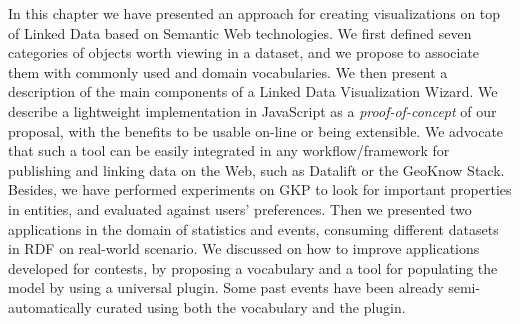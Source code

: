 In this chapter we have presented  an approach for creating visualizations on top of Linked Data based on Semantic Web technologies. We first defined seven categories of objects worth viewing in a dataset, and we propose to associate them with commonly used and domain vocabularies. We then present a description of the main components of a Linked Data Visualization Wizard. We describe a lightweight implementation in JavaScript as a \textit{proof-of-concept} of our proposal, with the benefits to be usable on-line or being extensible. We advocate that such a tool can be easily integrated  in any workflow/framework for publishing and linking data on the Web, such as Datalift or the GeoKnow Stack. Besides, we have performed experiments on GKP to look for important properties in entities, and evaluated against users' preferences. Then we presented two applications in the domain of statistics and events, consuming different datasets in RDF on real-world scenario. We discussed on how to improve applications developed for contests, by proposing a vocabulary and a tool for populating the model by using a universal plugin. Some past events have been already semi-automatically curated using both the vocabulary and the plugin.





